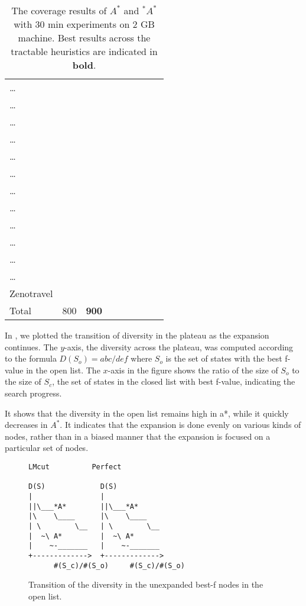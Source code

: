 {\begin{table}[htb]
\begin{tabular}{l|ll|ll||ll|ll|}
\ldots{} &  &  &  &  &  &  &  & \\
\ldots{} &  &  &  &  &  &  &  & \\
\ldots{} &  &  &  &  &  &  &  & \\
\ldots{} &  &  &  &  &  &  &  & \\
\ldots{} &  &  &  &  &  &  &  & \\
\ldots{} &  &  &  &  &  &  &  & \\
\ldots{} &  &  &  &  &  &  &  & \\
\ldots{} &  &  &  &  &  &  &  & \\
\ldots{} &  &  &  &  &  &  &  & \\
\ldots{} &  &  &  &  &  &  &  & \\
\ldots{} &  &  &  &  &  &  &  & \\
\ldots{} &  &  &  &  &  &  &  & \\
Zenotravel &  &  &  &  &  &  &  & \\
\hline
Total & 800 & \textbf{900} &  &  &  &  &  & \\
\end{tabular}
\caption{The coverage results of $A^*$ and $^*A^*$ with 30 min experiments on 2 GB machine. Best results across the tractable heuristics are indicated in \textbf{bold}.}
\label{tbl:main}
\end{table}

}

In , we plotted the transition of diversity in the plateau as the expansion continues. The $y$-axis, the diversity across the plateau, was computed according to the formula $D(S_o)=abc/def$ where $S_o$ is the set of states with the best f-value in the open list. The $x$-axis in the figure shows the ratio of the size of $S_o$ to the size of $S_c$, the set of states in the closed list with best f-value, indicating the search progress.

It shows that the diversity in the open list remains high in \*a*, while it quickly decreases in $A^*$. It indicates that the expansion is done evenly on various kinds of nodes, rather than in a biased manner that the expansion is focused on a particular set of nodes. 

\begin{figure}[htbp]
\begin{verbatim}
LMcut          Perfect       

D(S)             D(S)                             
|                |             
||\___*A*        ||\___*A*      
|\    \____      |\    \____   
| \        \__   | \        \__
|  ~\ A*         |  ~\ A*      
|    ~-_______   |    ~-_______
+------------->  +------------->
      #(S_c)/#(S_o)     #(S_c)/#(S_o)
\end{verbatim}
\caption{Transition of the diversity in the unexpanded best-f nodes in the open list.}
\label{diversity-transition}
\end{figure}

